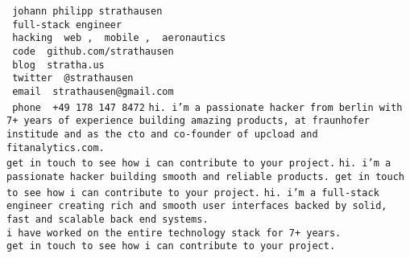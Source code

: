 \documentclass[a5paper,landscape]{article}
\newcommand{\blue}[1]{\texttt{\color{Green} #1}}
\newcommand{\red}[1]{\texttt{\color{WildStrawberry} #1}}
\begin{document}
\noindent
\huge
\red{johann philipp strathausen} \\
\blue{full-stack engineer} \\
\blue{hacking }\red{web}\blue{, }\red{mobile}\blue{, }\red{aeronautics} \\
\red{code }\blue{github.com/strathausen} \\
\red{blog }\blue{stratha.us} \\
\red{twitter }\blue{@strathausen} \\
\red{email }\blue{strathausen@gmail.com} \\
\red{phone }\blue{+49 178 147 8472}
\clearpage
\pagecolor{MidnightBlue}
\color{White}
\noindent
\texttt{hi.
  i'm a passionate hacker from berlin with
  7+ years of experience building amazing products,
  at fraunhofer institude and
  as the cto and co-founder of upcload and
  fitanalytics.com. \\
  get in touch to see how i can contribute to your project.}
\newpage
\noindent
\texttt{hi. i'm a passionate hacker building smooth and reliable products.
  get in touch to see how i can contribute to your project.}
\newpage
\noindent
\texttt{hi. i'm a full-stack engineer creating rich
  and smooth
  user interfaces backed by solid, fast and scalable back end
  systems.\\
  i have worked on the entire technology stack for 7+ years.\\
  get in touch to see how i can contribute to your project.}
\end{document}
